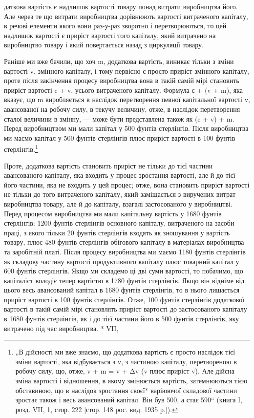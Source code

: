 даткова вартість є надлишок вартості товару понад витрати виробництва
його. Але через те що витрати виробництва дорівнюють
вартості витраченого капіталу, в речові елементи якого вони
раз-у-раз зворотно і перетворюються, то цей надлишок вартості
є приріст вартості того капіталу, який витрачено на виробництво
товару і який повертається назад з циркуляції товару.

Раніше ми вже бачили, що хоч m, додаткова вартість, виникає
тільки з зміни вартості v, змінного капіталу, і тому первісно
є просто приріст змінного капіталу, проте після закінчення
процесу виробництва вона в такій самій мірі становить
приріст вартості c + v, усього витраченого капіталу. Формула
с + (v + m), яка вказує, що m виробляється в наслідок перетворення
певної капітальної вартості v, авансованої на робочу силу,
в текучу величину, отже, в наслідок перетворення сталої величини
в змінну, — може бути представлена також як (c + v) + m.
Перед виробництвом ми мали капітал у 500 фунтів стерлінгів.
Після виробництва ми маємо капітал у 500 фунтів стерлінгів
плюс приріст вартості в 100 фунтів стерлінгів.\footnote{
„В дійсності ми вже знаємо, що додаткова вартість є просто наслідок
тієї зміни вартості, яка відбувається з v, з частиною капіталу, перетвореною
в робочу силу, що, отже, v + m = v + Δv (v плюс приріст v). Але дійсна зміна
вартості і відношення, в якому змінюється вартість, затемнюються тією обставиною,
що в наслідок зростання своєї* варіюючої складової частини зростає
також і весь авансований капітал. Він був 500, а стає 590“ (книга І, розд.
VII, 1, стор. 222 [стор. 148 рос. вид. 1935 р.]).
}

Проте, додаткова вартість становить приріст не тільки до
тієї частини авансованого капіталу, яка входить у процес зростання
вартості, але й до тієї його частини, яка не входить у цей
процес; отже, вона становить приріст вартості не тільки до того
витраченого капіталу, який заміщається з виручених витрат виробництва
товару, але й до капіталу, взагалі застосованого у виробництві.
Перед процесом виробництва ми мали капітальну
вартість у 1680 фунтів стерлінгів: 1200 фунтів стерлінгів основного
капіталу, витраченого на засоби праці, з якого тільки
20 фунтів стерлінгів входять як зношування у вартість товару,
плюс 480 фунтів стерлінгів обігового капіталу в матеріалах виробництва
та заробітній платі. Після процесу виробництва ми
маємо 1180 фунтів стерлінгів як складову частину вартості
продуктивного капіталу плюс товарний капітал у 600 фунтів
стерлінгів. Якщо ми складемо ці дві суми вартості, то побачимо,
що капіталіст володіє тепер вартістю в 1780 фунтів стерлінгів.
Якщо він відніме від цього весь авансований капітал в 1680
фунтів стерлінгів, то в нього лишається приріст вартості в 100
фунтів стерлінгів. Отже, 100 фунтів стерлінгів додаткової вартості
в такій самій мірі становлять приріст вартості до застосованого
капіталу в 1680 фунтів стерлінгів, як і до тієї частини
його в 500 фунтів стерлінгів, яку витрачено під час виробництва.
* VII,